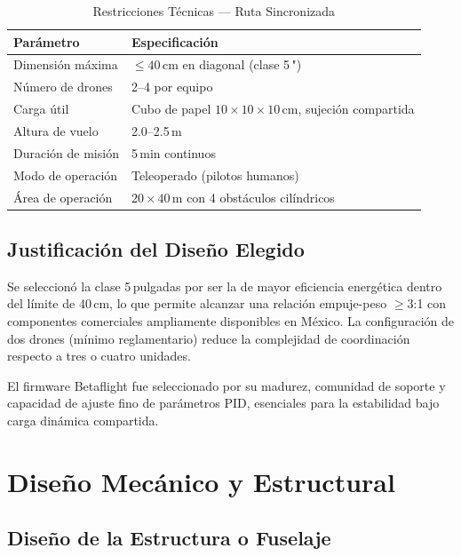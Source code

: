 \documentclass[10pt, twocolumn, letterpaper]{article}
\begin{document}
\begin{table}[H]
\caption{Restricciones Técnicas — Ruta Sincronizada}
\label{tab:restricciones}
\fontsize{8}{9}\selectfont
\begin{tabularx}{\columnwidth}{>{\raggedright}p{2.8cm} X}
\toprule
\textbf{Parámetro} & \textbf{Especificación} \\
\midrule
Dimensión máxima & $\leq 40$\,cm en diagonal (clase 5\,") \\
Número de drones & 2--4 por equipo \\
Carga útil & Cubo de papel $10\times10\times10$\,cm, sujeción compartida \\
Altura de vuelo & 2.0--2.5\,m \\
Duración de misión & 5\,min continuos \\
Modo de operación & Teleoperado (pilotos humanos) \\
Área de operación & $20\times40$\,m con 4 obstáculos cilíndricos \\
\bottomrule
\end{tabularx}
\end{table}

\subsection{Justificación del Diseño Elegido}
Se seleccionó la clase 5\,pulgadas por ser la de mayor eficiencia
energética dentro del límite de 40\,cm, lo que permite alcanzar una relación
empuje-peso $\geq 3$:1 con componentes comerciales ampliamente disponibles en
México. La configuración de dos drones (mínimo reglamentario) reduce la
complejidad de coordinación respecto a tres o cuatro unidades.

El firmware Betaflight fue seleccionado por su madurez, comunidad de soporte y
capacidad de ajuste fino de parámetros PID, esenciales para la estabilidad bajo
carga dinámica compartida.

\section{Diseño Mecánico y Estructural}
\subsection{Diseño de la Estructura o Fuselaje}
\noindent{}
\end{document}
